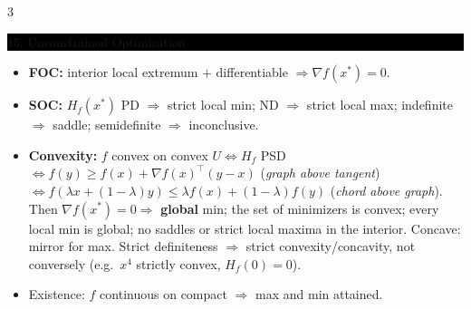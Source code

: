 \documentclass[8pt,letterpaper]{article}
\makeatletter
\newcommand{\sect}[1]{%
  \vspace{2.2pt}%
  \noindent\colorbox{black}{\parbox{\dimexpr\linewidth-2\fboxsep}{%
    \color{white}\bfseries\scshape\fontsize{6.4}{7.4}\selectfont
    \hyphenpenalty=10000\exhyphenpenalty=10000\raggedright #1}}%
  \vspace{1.4pt}\par\nopagebreak\@afterheading}
\newenvironment{tl}
  {\begin{itemize}[leftmargin=6pt,itemsep=0.3pt,topsep=1pt,parsep=0pt,
                   partopsep=0pt,label=\textcolor{gray}{\tiny$\bullet$}]}
  {\end{itemize}}
\newcommand{\tp}{^{\!\top}}
\makeatother
\begin{document}
\begin{multicols}{3}
\sect{15. Unconstrained Optimization}
\begin{tl}
\item \textbf{FOC:} interior local extremum $+$ differentiable $\Rightarrow\nabla f(x^*)=0$.
\item \textbf{SOC:} $H_f(x^*)$ PD $\Rightarrow$ strict local min; ND $\Rightarrow$ strict local max; indefinite $\Rightarrow$ saddle; semidefinite $\Rightarrow$ inconclusive.
\item \textbf{Convexity:} $f$ convex on convex $U\iff H_f$ PSD $\iff f(y)\ge f(x)+\nabla f(x)\tp(y-x)$ (\emph{graph above tangent}) $\iff f(\lambda x+(1-\lambda)y)\le\lambda f(x)+(1-\lambda)f(y)$ (\emph{chord above graph}). Then $\nabla f(x^*)=0\Rightarrow$ \textbf{global} min; the set of minimizers is convex; every local min is global; no saddles or strict local maxima in the interior. Concave: mirror for max. \colorbox{black!12}{Strict definiteness $\Rightarrow$ strict convexity/concavity, not conversely} (e.g.\ $x^4$ strictly convex, $H_f(0)=0$).
\item Existence: $f$ continuous on compact $\Rightarrow$ max and min attained.
\end{tl}


\end{multicols}
\end{document}

